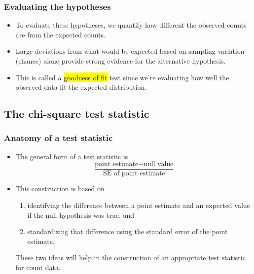 \documentclass[notes,11pt, aspectratio=169]{beamer}
\begin{document}

\begin{frame}
\frametitle{Evaluating the hypotheses}

\begin{itemize}

\item To evaluate these hypotheses, we quantify how different the observed counts are from the expected counts. 

\pause

\item Large deviations from what would be expected based on sampling variation (chance) alone provide strong evidence for the alternative hypothesis.

\pause

\item This is called a \hl{goodness of fit} test since we're evaluating how well the observed data fit the expected distribution.

\end{itemize}

\end{frame}


\subsection{The chi-square test statistic}


\begin{frame}
\frametitle{Anatomy of a test statistic}

\begin{itemize}

\item The general form of a test statistic is
\[ \frac{\text{point estimate} - \text{null value}}{\text{SE of point estimate}} \]

\pause

\item This construction is based on 
\begin{enumerate}
\item identifying the difference between a point estimate and an expected value if the null hypothesis was true, and 
\item standardizing that difference using the standard error of the point estimate. 
\end{enumerate}
\pause

These two ideas will help in the construction of an appropriate test statistic for count data.

\end{itemize}

\end{frame}
\end{document}
